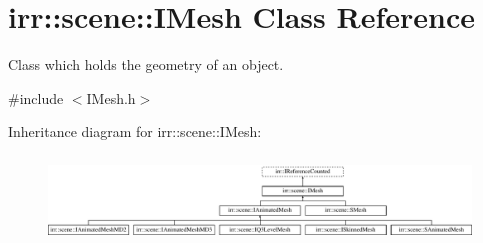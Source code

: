 \hypertarget{classirr_1_1scene_1_1IMesh}{}\section{irr\+:\+:scene\+:\+:I\+Mesh Class Reference}
\label{classirr_1_1scene_1_1IMesh}


Class which holds the geometry of an object.  




{\ttfamily \#include $<$I\+Mesh.\+h$>$}

Inheritance diagram for irr\+:\+:scene\+:\+:I\+Mesh\+:\begin{figure}[H]
\begin{center}
\leavevmode
\includegraphics[height=2.333333cm]{classirr_1_1scene_1_1IMesh}
\end{center}
\end{figure}
